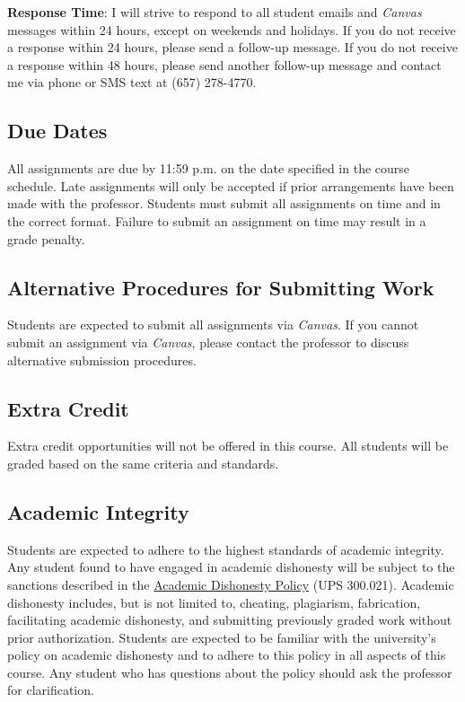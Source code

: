 \documentclass[12pt, letterpaper]{article}
\begin{document}
\textbf{Response Time}: I will strive to respond to all student emails and \emph{Canvas} messages within 24 hours, except on weekends and holidays. If you do not receive a response within 24 hours, please send a follow-up message. If you do not receive a response within 48 hours, please send another follow-up message and contact me via phone or SMS text at (657) 278-4770.

\subsection*{Due Dates}
All assignments are due by 11:59 p.m. on the date specified in the course schedule. Late assignments will only be accepted if prior arrangements have been made with the professor. Students must submit all assignments on time and in the correct format. Failure to submit an assignment on time may result in a grade penalty.

\subsection*{Alternative Procedures for Submitting Work}
Students are expected to submit all assignments via \emph{Canvas}. If you cannot submit an assignment via \emph{Canvas}, please contact the professor to discuss alternative submission procedures.

\subsection*{Extra Credit}
Extra credit opportunities will not be offered in this course. All students will be graded based on the same criteria and standards.

\subsection*{Academic Integrity}
Students are expected to adhere to the highest standards of academic integrity. Any student found to have engaged in academic dishonesty will be subject to the sanctions described in the \href{https://www.fullerton.edu/senate/publications_policies_resolutions/ups/UPS%20300/UPS%20300.021.pdf}{Academic Dishonesty Policy} (UPS 300.021). Academic dishonesty includes, but is not limited to, cheating, plagiarism, fabrication, facilitating academic dishonesty, and submitting previously graded work without prior authorization. Students are expected to be familiar with the university's policy on academic dishonesty and to adhere to this policy in all aspects of this course. Any student who has questions about the policy should ask the professor for clarification.
\end{document}
